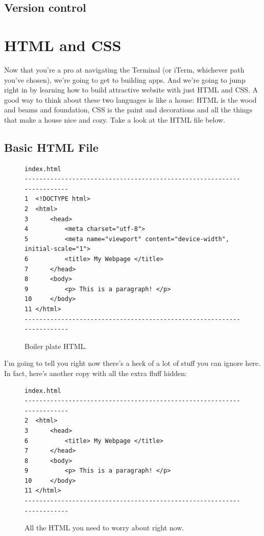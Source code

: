 \documentclass[12pt, letterpaper]{article}
\begin{document}
\subsection*{Version control}

\section{HTML and CSS}

Now that you're a pro at navigating the Terminal (or iTerm, whichever path you've chosen), we're going to get to building
apps. And we're going to jump right in by learning how to build attractive website with just HTML and CSS. A good
way to think about these two languages is like a house: HTML is the wood and beams and foundation, CSS is the paint
and decorations and all the things that make a house nice and cozy. Take a look at the HTML file below. \\

\subsection*{Basic HTML File}

\begin{figure}[ht]
\centering
\begin{BVerbatim}
index.html
-----------------------------------------------------------------------
1  <!DOCTYPE html>
2  <html>
3      <head>
4          <meta charset="utf-8">
5          <meta name="viewport" content="device-width", initial-scale="1">
6          <title> My Webpage </title>
7      </head>
8      <body>
9          <p> This is a paragraph! </p>
10     </body>
11 </html>
-----------------------------------------------------------------------
\end{BVerbatim}
\caption{Boiler plate HTML.}
\end{figure}


I'm going to tell you right now there's a heck of a lot of stuff you can ignore here. In fact, here's another copy with 
all the extra fluff hidden: \\

\begin{figure}[ht]
\centering
\begin{BVerbatim}
index.html
-----------------------------------------------------------------------
2  <html>
3      <head>
6          <title> My Webpage </title>
7      </head>
8      <body>
9          <p> This is a paragraph! </p>
10     </body>
11 </html>
-----------------------------------------------------------------------
\end{BVerbatim}
\caption{All the HTML you need to worry about right now.}
\end{figure}
\end{document}
